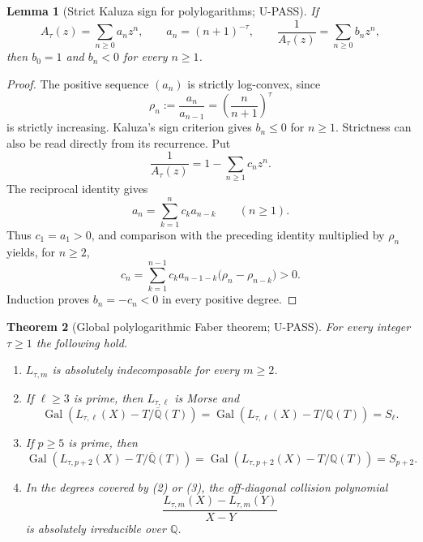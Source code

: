 \documentclass[11pt]{article}
\theoremstyle{keio}
\newtheorem{theorem}{Theorem}[section]
\newtheorem{lemma}[theorem]{Lemma}
\theoremstyle{definition}
\theoremstyle{remark}
\newcommand{\Q}{\mathbb Q}
\newcommand{\Gal}{\operatorname{Gal}}
\newcommand{\UPASS}{\textcolor{keiogreen}{\textsf{U-PASS}}}
\begin{document}
\begin{lemma}[Strict Kaluza sign for polylogarithms; \UPASS]
\label{lem:strict-kaluza}
If
\[
A_\tau(z)=\sum_{n\ge0}a_nz^n,
\qquad a_n=(n+1)^{-\tau},
\qquad
\frac1{A_\tau(z)}=\sum_{n\ge0}b_nz^n,
\]
then $b_0=1$ and $b_n<0$ for every $n\ge1$.
\end{lemma}

\begin{proof}
The positive sequence $(a_n)$ is strictly log-convex, since
\[
\rho_n:=\frac{a_n}{a_{n-1}}
=\left(\frac n{n+1}\right)^\tau
\]
is strictly increasing. Kaluza's sign criterion \cite{Kaluza1928} gives
$b_n\le0$ for $n\ge1$. Strictness can also be read directly from its
recurrence. Put
\[
\frac1{A_\tau(z)}=1-\sum_{n\ge1}c_nz^n.
\]
The reciprocal identity gives
\[
a_n=\sum_{k=1}^n c_ka_{n-k}\qquad(n\ge1).
\]
Thus $c_1=a_1>0$, and comparison with the preceding identity multiplied by
$\rho_n$ yields, for $n\ge2$,
\begin{equation}
c_n=\sum_{k=1}^{n-1}c_ka_{n-1-k}
\bigl(\rho_n-\rho_{n-k}\bigr)>0.
\label{eq:strict-kaluza-recurrence}
\end{equation}
Induction proves $b_n=-c_n<0$ in every positive degree.
\end{proof}

\begin{theorem}[Global polylogarithmic Faber theorem; \UPASS]
\label{thm:polylog-global}
For every integer $\tau\ge1$ the following hold.
\begin{enumerate}
\item $L_{\tau,m}$ is absolutely indecomposable for every $m\ge2$.
\item If $\ell\ge3$ is prime, then $L_{\tau,\ell}$ is Morse and
\[
\Gal(L_{\tau,\ell}(X)-T/\overline{\Q}(T))
=\Gal(L_{\tau,\ell}(X)-T/\Q(T))=S_\ell.
\]
\item If $p\ge5$ is prime, then
\[
\Gal(L_{\tau,p+2}(X)-T/\overline{\Q}(T))
=\Gal(L_{\tau,p+2}(X)-T/\Q(T))=S_{p+2}.
\]
\item In the degrees covered by (2) or (3), the off-diagonal collision
polynomial
\[
\frac{L_{\tau,m}(X)-L_{\tau,m}(Y)}{X-Y}
\]
is absolutely irreducible over $\Q$.
\end{enumerate}
\end{theorem}
\end{document}
